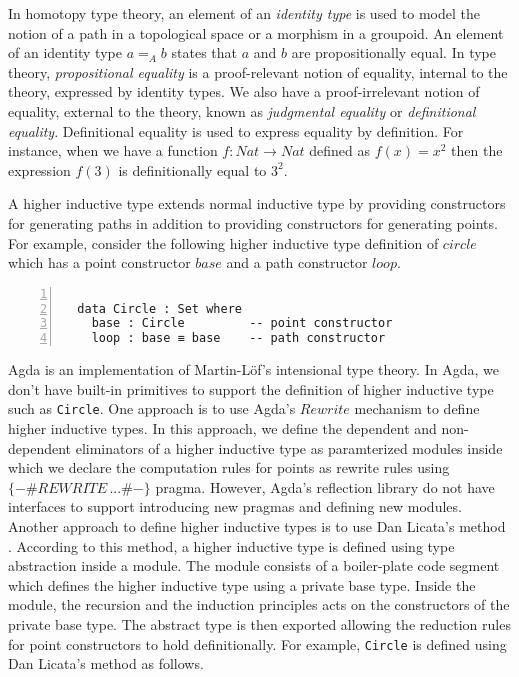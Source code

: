 \documentclass[sigplan,10pt]{acmart}
\begin{document}
In homotopy type theory, an element of an \emph{identity type} is used to model the notion of a path in a topological space or a morphism in a groupoid. An element of an identity type $a =_A b$ states that $a$ and $b$ are propositionally equal. In type theory, \emph{propositional equality} is a proof-relevant notion of equality, internal to the theory, expressed by identity types. We also have a proof-irrelevant notion of equality, external to the theory, known as \emph{judgmental equality} or \emph{definitional equality}. Definitional equality is used to express equality by definition. For instance, when we have a function $f : Nat \rightarrow Nat$ defined as $f(x) = x^2$ then the expression $f(3)$ is definitionally equal to $3^2$. 

A higher inductive type extends normal inductive type by providing constructors for generating paths in addition to providing constructors for generating points. For example, consider the following higher inductive type definition of $circle$ which has a point constructor $base$ and a path constructor $loop$.

\begin{center}
\begingroup
\fontsize{7pt}{9pt}\selectfont
\begin{Verbatim}[frame = lines, rulecolor=\color{blue}, numbers = left, numbersep = 0pt]

  data Circle : Set where
    base : Circle         -- point constructor
    loop : base ≡ base    -- path constructor

\end{Verbatim}
\endgroup
\end{center}

\normalsize

Agda is an implementation of Martin-Löf’s intensional type theory. In Agda, we don't have built-in primitives to support the definition of higher inductive type such as {\tt Circle}. One approach is to use Agda's $Rewrite$ \cite{Agda-doc-2017} mechanism to define higher inductive types. In this approach, we define the dependent and non-dependent eliminators of a higher inductive type as paramterized modules inside which we declare the computation rules for points as rewrite rules using $\{-\# REWRITE \, ...\#-\}$ pragma. However, Agda's reflection library do not have interfaces to support introducing new pragmas and defining new modules. Another approach to define higher inductive types is to use Dan Licata's method \cite{Licata-2011}. According to this method, a higher inductive type is defined using type abstraction inside a module. The module consists of a boiler-plate code segment which defines the higher inductive type using a private base type. Inside the module, the recursion and the induction principles acts on the constructors of the private base type. The abstract type is then exported allowing the reduction rules for point constructors to hold definitionally. For example, {\tt Circle} is defined using Dan Licata's method as follows.
\end{document}
